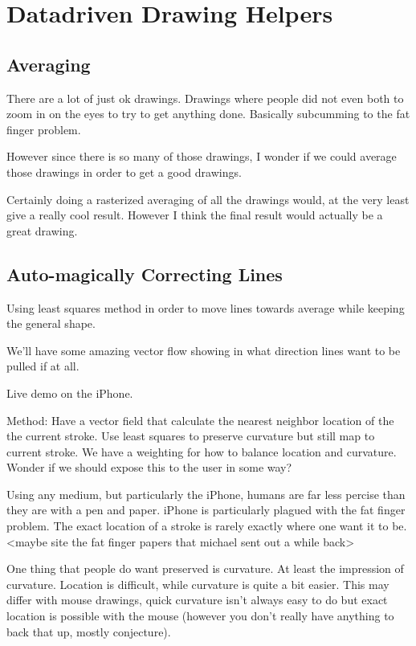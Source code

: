 \section{Datadriven Drawing Helpers}

\subsection{Averaging}
There are a lot of just ok drawings. Drawings where people did not even both to zoom in on the eyes to try to get anything done. Basically subcumming to the fat finger problem.

However since there is so many of those drawings, I wonder if we could average those drawings in order to get a good drawings.

Certainly doing a rasterized averaging of all the drawings would, at the very least give a really cool result. However I think the final result would actually be a great drawing.


\subsection{Auto-magically Correcting Lines}
Using least squares method in order to move lines towards average while keeping the general shape.

We'll have some amazing vector flow showing in what direction lines want to be pulled if at all.

Live demo on the iPhone.

Method:
Have a vector field that calculate the nearest neighbor location of the the current stroke.
Use least squares to preserve curvature but still map to current stroke.
We have a weighting for how to balance location and curvature. Wonder if we should expose this to the user in some way?


Using any medium, but particularly the iPhone, humans are far less percise than they are with a pen and paper. iPhone is particularly plagued with the fat finger problem. The exact location of a stroke is rarely exactly where one want it to be. <maybe site the fat finger papers that michael sent out a while back> 

One thing that people do want preserved is curvature. At least the impression of curvature. Location is difficult, while curvature is quite a bit easier. This may differ with mouse drawings, quick curvature isn't always easy to do but exact location is possible with the mouse (however you don't really have anything to back that up, mostly conjecture).

